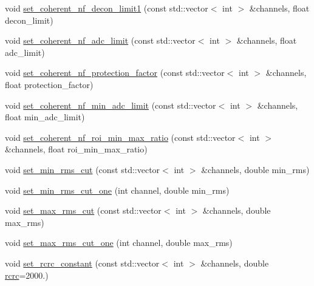 \begin{DoxyCompactItemize}
\item 
void \hyperlink{class_wire_cell_1_1_sig_proc_1_1_simple_channel_noise_d_b_ab58c3af3127913b121bb9bee04cc56d9}{set\+\_\+coherent\+\_\+nf\+\_\+decon\+\_\+limit1} (const std\+::vector$<$ int $>$ \&channels, float decon\+\_\+limit)
\item 
void \hyperlink{class_wire_cell_1_1_sig_proc_1_1_simple_channel_noise_d_b_a33d9cbe6648bda8c2a0d05fca376f461}{set\+\_\+coherent\+\_\+nf\+\_\+adc\+\_\+limit} (const std\+::vector$<$ int $>$ \&channels, float adc\+\_\+limit)
\item 
void \hyperlink{class_wire_cell_1_1_sig_proc_1_1_simple_channel_noise_d_b_a1a1ea9a4e47ddfe6c88f9eec682776bf}{set\+\_\+coherent\+\_\+nf\+\_\+protection\+\_\+factor} (const std\+::vector$<$ int $>$ \&channels, float protection\+\_\+factor)
\item 
void \hyperlink{class_wire_cell_1_1_sig_proc_1_1_simple_channel_noise_d_b_a045c735c118842078036c1619a637525}{set\+\_\+coherent\+\_\+nf\+\_\+min\+\_\+adc\+\_\+limit} (const std\+::vector$<$ int $>$ \&channels, float min\+\_\+adc\+\_\+limit)
\item 
void \hyperlink{class_wire_cell_1_1_sig_proc_1_1_simple_channel_noise_d_b_a92f9ca90518ecd1833bb3e4dfcbf9488}{set\+\_\+coherent\+\_\+nf\+\_\+roi\+\_\+min\+\_\+max\+\_\+ratio} (const std\+::vector$<$ int $>$ \&channels, float roi\+\_\+min\+\_\+max\+\_\+ratio)
\item 
void \hyperlink{class_wire_cell_1_1_sig_proc_1_1_simple_channel_noise_d_b_a5113500df9dcd76defe1493534c4c9bc}{set\+\_\+min\+\_\+rms\+\_\+cut} (const std\+::vector$<$ int $>$ \&channels, double min\+\_\+rms)
\item 
void \hyperlink{class_wire_cell_1_1_sig_proc_1_1_simple_channel_noise_d_b_a110d73be2690691e60d916bf8cbb4ea9}{set\+\_\+min\+\_\+rms\+\_\+cut\+\_\+one} (int channel, double min\+\_\+rms)
\item 
void \hyperlink{class_wire_cell_1_1_sig_proc_1_1_simple_channel_noise_d_b_a1a5c77d29d9f65e62ce9a811c80ebaca}{set\+\_\+max\+\_\+rms\+\_\+cut} (const std\+::vector$<$ int $>$ \&channels, double max\+\_\+rms)
\item 
void \hyperlink{class_wire_cell_1_1_sig_proc_1_1_simple_channel_noise_d_b_ab82464e57bc12304c2d90e9eb075a930}{set\+\_\+max\+\_\+rms\+\_\+cut\+\_\+one} (int channel, double max\+\_\+rms)
\item 
void \hyperlink{class_wire_cell_1_1_sig_proc_1_1_simple_channel_noise_d_b_a1c4c378e91ff2ead5aff08bc3615b1d2}{set\+\_\+rcrc\+\_\+constant} (const std\+::vector$<$ int $>$ \&channels, double \hyperlink{class_wire_cell_1_1_sig_proc_1_1_simple_channel_noise_d_b_a9a4481bf485a0aaa4903094463f4e2b3}{rcrc}=2000.)

\end{DoxyCompactItemize}
